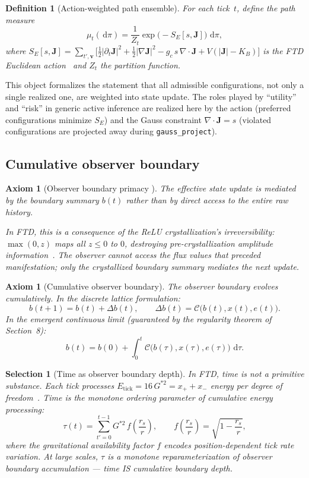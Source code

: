 \documentclass[11pt]{article}
\theoremstyle{tight}
\theoremstyle{plainroman}
\newtheorem{axiom}[theorem]{Axiom}
\newtheorem{selection}[theorem]{Selection}
\newtheorem{definition}[theorem]{Definition}
\newcommand{\dd}{\,\mathrm{d}}
\begin{document}
\begin{definition}[Action-weighted path ensemble]
For each tick~$t$, define the path measure
\[
\mu_t(\dd \pi)=\frac{1}{Z_t}\exp\!\bigl(-S_E[s,\mathbf J]\bigr)\,\dd \pi,
\]
where $S_E[s,\mathbf J]=\sum_{t',\mathbf v}\bigl[\tfrac12|\partial_t\mathbf J|^2+\tfrac12|\nabla\mathbf J|^2-g_c\,s\,\nabla\!\cdot\!\mathbf J+V(|\mathbf J|-K_B)\bigr]$ is the FTD Euclidean action~\cite{ftdpath} and $Z_t$ the partition function.
\end{definition}
This object formalizes the statement that all admissible configurations, not only a single realized one, are weighted into state update.
The roles played by ``utility'' and ``risk'' in generic active inference are realized here by the action (preferred configurations minimize $S_E$) and the Gauss constraint $\nabla\!\cdot\!\mathbf J=s$ (violated configurations are projected away during \texttt{gauss\_project}).

\subsection{Cumulative observer boundary}

\begin{axiom}[Observer boundary primacy {}]
The effective state update is mediated by the boundary summary $b(t)$ rather than by direct access to the entire raw history.

In FTD, this is a consequence of the ReLU crystallization's irreversibility: $\max(0,z)$ maps all $z\le 0$ to $0$, destroying pre-crystallization amplitude information~\cite{ftdvnc}.
The observer cannot access the flux values that preceded manifestation; only the crystallized boundary summary mediates the next update.
\end{axiom}

\begin{axiom}[Cumulative observer boundary]
The observer boundary evolves cumulatively. In the discrete lattice formulation:
\[
b(t+1)=b(t)+\Delta b(t), \qquad \Delta b(t)=\mathcal C\bigl(b(t),x(t),e(t)\bigr).
\]
In the emergent continuous limit (guaranteed by the regularity theorem of Section~8):
\[
b(t)=b(0)+\int_0^t \mathcal C\bigl(b(\tau),x(\tau),e(\tau)\bigr)\,\dd \tau.
\]
\end{axiom}

\begin{selection}[Time as observer boundary depth]
In FTD, time is not a primitive substance.
Each tick processes $E_{\text{tick}}=16\,G^{*2}=x_++x_-$ energy per degree of freedom~\cite{ftdtime}.
Time is the monotone ordering parameter of cumulative energy processing:
\[
\tau(t)=\sum_{t'=0}^{t-1} G^{*2}\,f\!\left(\frac{r_s}{r}\right), \qquad f\!\left(\frac{r_s}{r}\right)=\sqrt{1-\frac{r_s}{r}},
\]
where the gravitational availability factor $f$ encodes position-dependent tick rate variation. At large scales, $\tau$ is a monotone reparameterization of observer boundary accumulation --- time IS cumulative boundary depth.
\end{selection}
\end{document}
